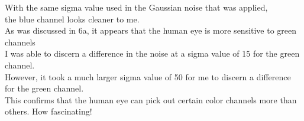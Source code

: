 With the same sigma value used in the Gaussian noise that was applied,\\
the blue channel looks cleaner to me.\\
As was discussed in 6a, it appears that the human eye is more sensitive to green channels\\
I was able to discern a difference in the noise at a sigma value of 15 for the green channel.\\
However, it took a much larger sigma value of 50 for me to discern a difference for the green channel.\\
This confirms that the human eye can pick out certain color channels more than others. How fascinating!\\
